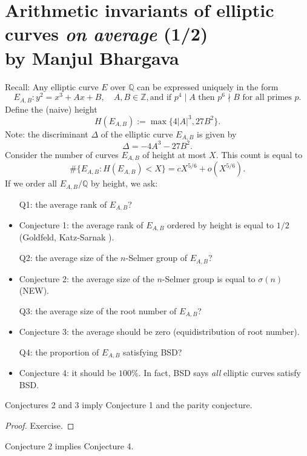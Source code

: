 \documentclass[12pt,amsfont]{amsart}
\begin{document}
\newpage
\section{Arithmetic invariants of elliptic curves \emph{on average} (1/2) \\by Manjul Bhargava}\label{1}

Recall: Any elliptic curve $E$ over $\mathbb{Q}$ can be expressed uniquely in the form
\[
\displaystyle E_{A, B}: y^2 = x^3 + Ax + B, \quad A,B \in \mathbb{Z},\text{and if }p^4 \mid A\text{ then }p^6 \nmid B\text{ for all primes }p.
\]
Define the (naive) height 
\[
H(E_{A,B}):=\max\{4 |A|^3, 27 B^2\}. 
\]
Note: the discriminant $\Delta$ of the elliptic curve $E_{A,B}$ is given by
\[
 \Delta = -4A^3 - 27B^2.
 \]
Consider the number of curves $E_{A,B}$ of height at most $X$. This count is equal to
$$\displaystyle \# \{E_{A,B}: H(E_{A,B}) < X\} = cX^{5/6} +o(X^{5/6}).$$
If we order all $E_{A,B}/\mathbb{Q}$ by height, we ask: 
\begin{itemize}
\item[Q1:] the average rank of $E_{A,B}$?
\item
Conjecture 1: the average rank of $E_{A,B}$ ordered by height is equal to $1/2$ (Goldfeld, Katz-Sarnak ). 
\item[Q2:] the average size of the $n$-Selmer group of $E_{A,B}$? 
\item 
Conjecture 2: the average size of the $n$-Selmer group is equal to $\sigma(n)$ (NEW). 
\item[Q3:] the average size of the root number of $E_{A,B}$? 
\item
Conjecture 3: the average should be zero (equidistribution of root number). 
\item[Q4:] the proportion of $E_{A,B}$ satisfying BSD? 
\item Conjecture 4: it should be $100\%$. In fact, BSD says \emph{all} elliptic curves satisfy BSD. 
\end{itemize}
\begin{thm} Conjectures 2 and 3 imply Conjecture 1 and the parity conjecture.

\end{thm}

\begin{proof} Exercise. \end{proof}

\begin{thm}\label{T2} 
Conjecture 2 implies Conjecture 4. 
\end{thm}
\end{document}
